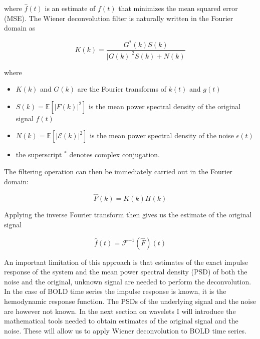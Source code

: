 where $\hat{f}(t)$ is an estimate of $f(t)$ that minimizes the mean squared error (MSE). The Wiener deconvolution filter is naturally written in 
the Fourier domain as 

\begin{equation}
    K(k) = \frac{G^*(k) S(k)}{|G(k)|^2 S(k) + N(k)}
    \label{eq:wiener_deconv}
\end{equation}

where 

\begin{itemize}
    \item $K(k)$ and $G(k)$ are the Fourier transforms of $k(t)$ and $g(t)$
    \item $S(k) = \mathbb{E}[|F(k)|^2]$ is the mean power spectral density of the original signal $f(t)$
    \item $N(k) = \mathbb{E}[|\mathcal{E}(k)|^2]$ is the mean power spectral density of the noise $\epsilon(t)$
    \item the superscript $^*$ denotes complex conjugation.
\end{itemize}

The filtering operation can then be immediately carried out in the Fourier domain:

\begin{equation}
    \hat{F}(k) = K(k) H(k)
    \label{eq:wiener_filter_fourier}
\end{equation}

Applying the inverse Fourier transform then gives us the estimate of the original signal

\begin{equation}
    \hat{f}(t) = \mathscr{F}^{-1}(\hat{F})(t)
\end{equation}

An important limitation of this approach is that estimates of the exact impulse response of the system
and the mean power spectral density (PSD) of both the noise and the original, unknown signal are needed to perform the deconvolution. In the case of BOLD
time series the impulse response is known, it is the hemodynamic response function. The PSDs of the underlying signal and the noise are however not known.
In the next section on wavelets I will introduce the mathematical tools needed to obtain estimates of the original signal and the noise. 
These will allow us to apply Wiener deconvolution to BOLD time series.
